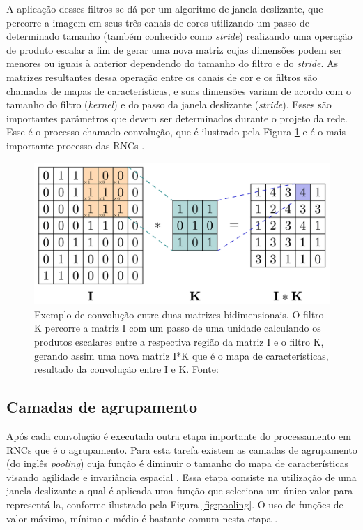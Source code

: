 A aplicação desses filtros se dá por um algoritmo de janela deslizante, que percorre a imagem em seus três canais de cores utilizando um passo de determinado tamanho (também conhecido como \textit{stride}) realizando uma operação de produto escalar a fim de gerar uma nova matriz cujas dimensões podem ser menores ou iguais à anterior dependendo do tamanho do filtro e do \textit{stride}. As matrizes resultantes dessa operação entre os canais de cor e os filtros são chamadas de mapas de características, e suas dimensões variam de acordo com o tamanho do filtro (\textit{kernel}) e do passo da janela deslizante (\textit{stride}). Esses são importantes parâmetros que devem ser determinados durante o projeto da rede. Esse é o processo chamado convolução, que é ilustrado pela Figura \ref{fig:conv2d} e é o mais importante processo das \ac{RNC}s \cite{geron2019maos}. 


\begin{figure}[H]
  \centering
  \includegraphics[width=.5\linewidth]{figures/2_theoric_foundamentations/conv2d.png}
  \caption[Exemplo de convolução entre duas matrizes bidimensionais.]{Exemplo de convolução entre duas matrizes bidimensionais. O filtro K percorre a matriz I com um passo de uma unidade calculando os produtos escalares entre a respectiva região da matriz I e o filtro K, gerando assim uma nova matriz I*K que é o mapa de características, resultado da convolução entre I e K. Fonte: \cite{fig-conv2d}}
  \label{fig:conv2d}
\end{figure}

\subsection{Camadas de agrupamento}

Após cada convolução é executada outra etapa importante do processamento em \ac{RNC}s que é o agrupamento. Para esta tarefa existem as camadas de agrupamento (do inglês \textit{pooling}) cuja função é diminuir o tamanho do mapa de características visando agilidade e invariância espacial \cite{rawat2017deep}. Essa etapa consiste na utilização de uma janela deslizante a qual é aplicada uma função que seleciona um único valor para representá-la, conforme ilustrado pela Figura \ref{fig:pooling}. O uso de funções de valor máximo, mínimo e médio é bastante comum nesta etapa \cite{geron2019maos}.

